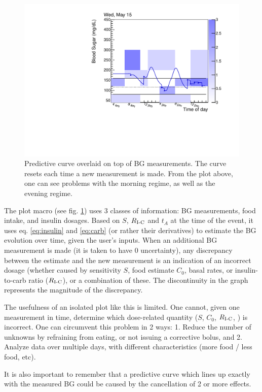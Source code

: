 \begin{figure}[htbp]
\begin{center}
\includegraphics[width=4.5in]{figures/example_predictive.pdf}
\caption{Predictive curve overlaid on top of BG measurements. The curve resets each time a new measurement is made. From the plot above, one can see problems with the morning regime, as well as the evening regime. 
}
\label{fig:predictive}
\end{center}
\end{figure}

The plot macro (see fig. \ref{fig:predictive}) uses 3 classes of information: BG measurements, food intake, and insulin dosages. Based on $S$, $R_\text{I-C}$ and $t_A$ at the time of the event, it uses eq. \ref{eq:insulin} and \ref{eq:carb} (or rather their derivatives) to estimate the BG evolution over time, given the user's inputs. When an additional BG measurement is made (it is taken to have 0 uncertainty), any discrepancy between the estimate and the new measurement is an indication of an incorrect dosage (whether caused by sensitivity $S$, food estimate $C_0$, basal rates, or insulin-to-carb ratio ($R_\text{I-C}$), or a combination of these. The discontinuity in the graph represents the magnitude of the discrepancy.

The usefulness of an isolated plot like this is limited. One cannot, given one measurement in time, determine which dose-related quantity ($S$, $C_0$, $R_\text{I-C}$, \rbas) is incorrect. One can circumvent this problem in 2 ways: 1. Reduce the number of unknowns by refraining from eating, or not issuing a corrective bolus, and 2. Analyze data over multiple days, with different characteristics (more food / less food, etc). 

It is also important to remember that a predictive curve which lines up exactly with the measured BG could be caused by the cancellation of 2 or more effects.

